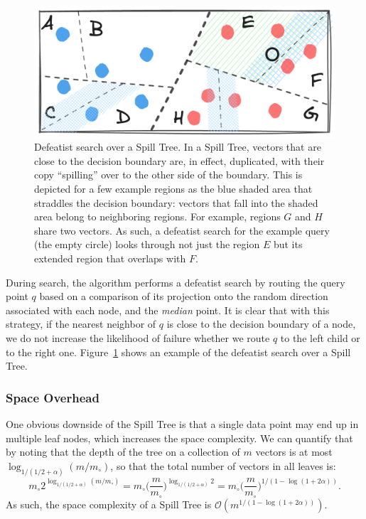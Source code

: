 \begin{figure}[t]
    \centering
    \includegraphics[width=0.6\linewidth]{figures/branch-and-bound-spill-tree.png}
    \caption{Defeatist search over a Spill Tree. In a Spill Tree, vectors that are
    close to the decision boundary are, in effect, duplicated, with their copy ``spilling'' over
    to the other side of the boundary. This is depicted for a few example regions
    as the blue shaded area that straddles the decision boundary: vectors that fall into the shaded
    area belong to neighboring regions. For example, regions $G$ and $H$ share two vectors.
    As such, a defeatist search for the example query (the empty circle) looks through not just the region
    $E$ but its extended region that overlaps with $F$.}
    \label{figure:branch-and-bound:spill-tree}
\end{figure}

During search, the algorithm performs a defeatist search by routing the query point $q$
based on a comparison of its projection onto the random direction associated with each node,
and the \emph{median} point. It is clear that with this strategy, if the nearest neighbor
of $q$ is close to the decision boundary of a node, we do not increase the likelihood of
failure whether we route $q$ to the left child or to the right one. Figure~\ref{figure:branch-and-bound:spill-tree}
shows an example of the defeatist search over a Spill Tree.

\subsubsection{Space Overhead}
One obvious downside of the Spill Tree is that a single data point
may end up in multiple leaf nodes, which increases the space complexity.
We can quantify that by noting that the depth of the tree on a collection of $m$ vectors
is at most $\log_{1/(1/2 + \alpha)} (m/m_\circ)$, so that the total number of vectors in all leaves
is:
\begin{equation*}
    m_\circ 2^{\log_{1/(1/2 + \alpha)} (m/m_\circ)} = m_\circ \big( \frac{m}{m_\circ} \big)^{\log_{1/(1/2 + \alpha)} 2} =
    m_\circ \big( \frac{m}{m_\circ} \big)^{1/(1 - \log(1 + 2\alpha))}.
\end{equation*}
As such, the space complexity of a Spill Tree is $\mathcal{O}(m^{1/(1 - \log(1 + 2 \alpha))})$.

